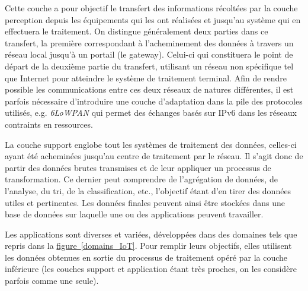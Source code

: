 \documentclass[]{article}
\newcommand{\minit}[1]{\noindent{\small\textbf{ \underline{#1}}}\vspace{0.2cm}}
\newcommand{\wordlink}[2]{\hyperref[#1]{#2~\ref{#1}}}
\begin{document}
Cette couche a pour objectif le transfert des informations récoltées par la couche perception depuis les équipements qui les ont réalisées et jusqu'au système qui en effectuera le traitement. On distingue généralement deux parties dans ce transfert, la première correspondant à l'acheminement des données à travers un réseau local jusqu'à un portail (le gateway). Celui-ci qui constituera le point de départ de la deuxième partie du transfert, utilisant un réseau non spécifique tel que Internet pour atteindre le système de traitement terminal. Afin de rendre possible les communications entre ces deux réseaux de natures différentes, il est parfois nécessaire d'introduire une couche d'adaptation dans la pile des protocoles utilisés, e.g. \textit{6LoWPAN} \cite{wiki6lowpan} qui permet des échanges basés sur IPv6 dans les réseaux contraints en ressources.\\

\minit{La couche support}

La couche support englobe tout les systèmes de traitement des données, celles-ci ayant été acheminées jusqu'au centre de traitement par le réseau. Il s'agit donc de partir des données brutes transmises et de leur appliquer un processus de transformation. Ce dernier peut comprendre de l'agrégation de données, de l'analyse, du tri, de la classification, etc., l'objectif étant d'en tirer des données utiles et pertinentes. Les données finales peuvent ainsi être stockées dans une base de données sur laquelle une ou des applications peuvent travailler.\\

 
\minit{La couche application}

Les applications sont diverses et variées, développées dans des domaines tels que repris dans la \wordlink{domains_IoT}{figure}. Pour remplir leurs objectifs, elles utilisent les données obtenues en sortie du processus de traitement opéré par la couche inférieure (les couches support et application étant très proches, on les considère parfois comme une seule).
%
\end{document}
